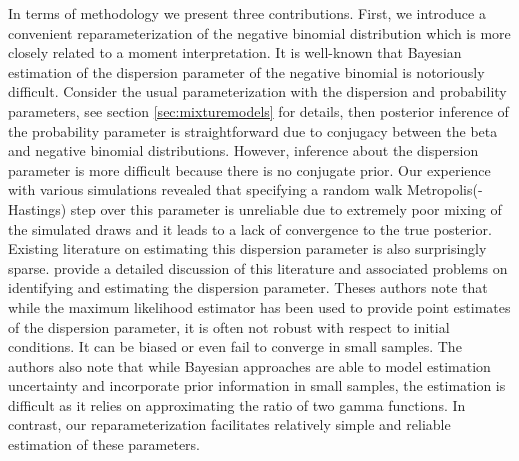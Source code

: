 \documentclass[11pt]{article}
\begin{document}
In terms of methodology we present three contributions. First, we introduce a convenient reparameterization of the negative binomial distribution which is more closely related to a moment interpretation. It is well-known that Bayesian estimation of the dispersion parameter of the negative binomial is notoriously difficult. Consider the usual parameterization with the dispersion and probability parameters, see section \ref{sec:mixturemodels} for details, then posterior inference of the probability parameter is straightforward due to conjugacy between the beta and negative binomial distributions. However, inference about the dispersion parameter is more difficult because there is no conjugate prior. Our experience with various simulations revealed that specifying a random walk Metropolis(-Hastings) step over this parameter is unreliable due to extremely poor mixing of the simulated draws and it leads to a lack of convergence to the true posterior. Existing literature on estimating this dispersion parameter is also surprisingly sparse. \cite{zhou2013negative} provide a detailed discussion of this literature and associated problems on identifying and estimating the dispersion parameter. Theses authors note that while the maximum likelihood estimator has been used to provide point estimates of the dispersion parameter, it is often not robust with respect to initial conditions. It can be biased or even fail to converge in small samples. The authors also note that while Bayesian approaches are able to model estimation uncertainty and incorporate prior information in small samples, the estimation is difficult as it relies on approximating the ratio of two gamma functions. In contrast, our reparameterization facilitates relatively simple and reliable estimation of these parameters.
\end{document}
